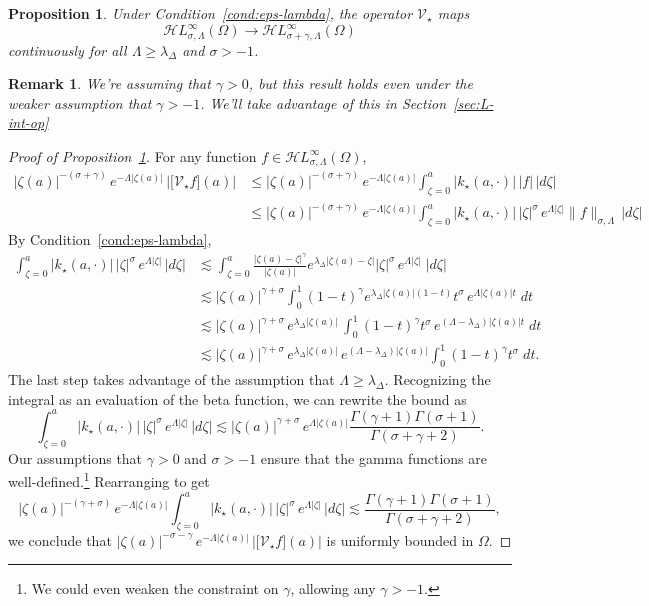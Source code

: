 \documentclass{article}
\theoremstyle{plain}
\newtheorem{prop}{Proposition}
\newtheorem{rmk}{Remark}
\newcommand{\singexp}[2]{\mathcal{H}L^\infty_{#1, #2}}
\newcommand{\softpart}{\mathcal{V}_\star}
\newcommand{\softker}{k_\star}
\newcommand{\domain}{\Omega}
\begin{document}
\begin{prop}\label{prop:smoothing}
Under {\em Condition~\eqref{cond:eps-lambda}}, the operator $\softpart$ maps
\[ \singexp{\sigma}{\Lambda}(\Omega) \to \singexp{\sigma+\gamma}{\Lambda}(\Omega) \]
continuously for all $\Lambda\geq \lambda_{\Delta}$ and $\sigma>-1$.
\end{prop}
\begin{rmk}
We're assuming that $\gamma > 0$, but this result holds even under the weaker assumption that $\gamma > -1$. We'll take advantage of this in Section~\ref{sec:L-int-op}
\end{rmk}
\begin{proof}[Proof of Proposition~\ref{prop:smoothing}]
For any function $f\in\singexp{\sigma}{\Lambda}(\domain)$,
\begin{align*}
|\zeta(a)|^{-(\sigma+\gamma)} \, e^{-\Lambda |\zeta(a)|} \, \Big \vert \big[ \softpart f\big](a)\Big\vert
&\leq |\zeta(a)|^{-(\sigma+\gamma)}\, e^{-\Lambda |\zeta(a)|} \int_{\zeta=0}^a |\softker(a,\cdot)|\, |f| \, |d\zeta| \\
&\leq |\zeta(a)|^{-(\sigma+\gamma)}\, e^{-\Lambda |\zeta(a)|} \int_{\zeta=0}^a |\softker(a,\cdot)|\, |\zeta|^{\sigma}\, e^{\Lambda |\zeta|} \|f\|_{\sigma,\Lambda} \, |d\zeta| 
\end{align*}
By Condition~\eqref{cond:eps-lambda},
\begin{align*}
\int_{\zeta=0}^a |\softker(a,\cdot)|\, |\zeta|^{\sigma}\, e^{\Lambda |\zeta|} \, |d\zeta| &\lesssim \int_{\zeta=0}^a \frac{|\zeta(a)-\zeta|^\gamma}{|\zeta(a)|} e^{\lambda_\Delta |\zeta(a)-\zeta|} |\zeta|^{\sigma}\, e^{\Lambda|\zeta|}\;|d\zeta|\\
&\lesssim |\zeta(a)|^{\gamma+\sigma} \int_{0}^1 (1-t)^\gamma e^{\lambda_\Delta |\zeta(a)|(1-t)} t^{\sigma}\, e^{\Lambda|\zeta(a)| t}\;dt\\
&\lesssim |\zeta(a)|^{\gamma+\sigma}\, e^{\lambda_\Delta |\zeta(a)|}\,  \int_{0}^1 (1-t)^\gamma  t^{\sigma}\,e^{(\Lambda-\lambda_\Delta)|\zeta(a)| t}\;dt\\
&\lesssim |\zeta(a)|^{\gamma+\sigma}\, e^{\lambda_\Delta |\zeta(a)|}\,e^{(\Lambda-\lambda_\Delta)|\zeta(a)|}\int_{0}^1 (1-t)^\gamma  t^{\sigma}\;dt.
\end{align*}
The last step takes advantage of the assumption that $\Lambda \ge \lambda_\Delta$. Recognizing the integral as an evaluation of the beta function, we can rewrite the bound as
\[ \int_{\zeta=0}^a |\softker(a,\cdot)|\, |\zeta|^{\sigma}\, e^{\Lambda |\zeta|} \, |d\zeta| \lesssim |\zeta(a)|^{\gamma+\sigma}\, e^{\Lambda |\zeta(a)|} \frac{\Gamma(\gamma+1)\Gamma(\sigma+1)}{\Gamma(\sigma+\gamma+2)}. \]
Our assumptions that $\gamma > 0$ and $\sigma > -1$ ensure that the gamma functions are well-defined.\footnote{We could even weaken the constraint on $\gamma$, allowing any $\gamma > -1$.} Rearranging to get
\[ |\zeta(a)|^{-(\gamma+\sigma)}\, e^{-\Lambda |\zeta(a)|} \int_{\zeta=0}^a |\softker(a,\cdot)|\, |\zeta|^{\sigma}\, e^{\Lambda |\zeta|} \, |d\zeta| \lesssim \frac{\Gamma(\gamma+1)\Gamma(\sigma+1)}{\Gamma(\sigma+\gamma+2)}, \]
we conclude that $|\zeta(a)|^{-\sigma-\gamma} \, e^{-\Lambda |\zeta(a)|} \, \Big \vert \big[ \softpart f\big](a)\Big\vert$ is uniformly bounded in $\domain$. 
\end{proof}
\end{document}

